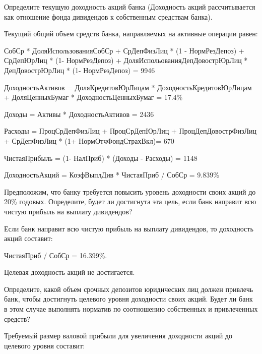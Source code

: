 \documentclass[12pt, table]{exam}
\begin{document}
\begin{questions}
\begin{subparts}
	\subpart[5] Определите текущую доходность акций банка (Доходность акций рассчитывается как отношение фонда дивидендов к собственным средствам банка). 
	
	\begin{solution}[6em]
		
		Текущий общий объем средств банка, направляемых на активные операции равен:
		
		СобСр * ДоляИспользованияСобСр + СрДепФизЛиц * (1 - НормРезДепоз) + СрДепЮрЛиц * (1- НормРезДепоз)  + ДоляИспольованияДепДовострЮрЛиц * ДепДовострЮрЛиц * (1- НормРезДепоз) = 9946
						
		
		ДоходностьАктивов = ДоляКредитовЮрЛицам * ДоходностьКредитовЮрЛицам + ДоляЦенныхБумаг * ДоходностьЦенныхБумаг = 17.4\%
		
		Доходы = Активы * ДоходностьАктивов = 2436
		
		Расходы = ПроцСрДепФизЛиц + ПроцСрДепЮрЛиц + ПроцДепДовострФизЛиц + 
		СрДепФизЛиц * (1+ НормОтчФондСтрахВкл)= 670
				
		ЧистаяПрибыль = (1- НалПриб) * (Доходы - Расходы) = 1148
				
		ДоходностьАкций = КоэфВыплДив * ЧистаяПриб / СобСр = 9.839\%
		
		
	\end{solution}
	
	\subpart[5] Предположим, что банку требуется повысить уровень доходности своих акций до 20\% годовых. Определите, будет ли достигнута эта цель, если банк направит всю чистую прибыль на выплату дивидендов?
	
	\begin{solution}[6em]
		
		Если банк направит всю чистую прибыль на выплату дивидендов, то доходность акций составит:
		
		ЧистаяПриб / СобСр = 16.399\%.
		
		Целевая доходность акций не достигается.
	\end{solution}
	
	\subpart[10] Определите, какой объем срочных депозитов юридических лиц должен привлечь банк, чтобы достигнуть целевого уровня доходности своих акций. Будет ли банк в этом случае выполнять норматив по соотношению собственных и привлеченных средств?
	
	\begin{solution}[6em]
		
		Требуемый размер валовой прибыли для увеличения доходности акций до целевого уровня составит:
		

\end{solution}
\end{subparts}
\end{questions}
\end{document}

